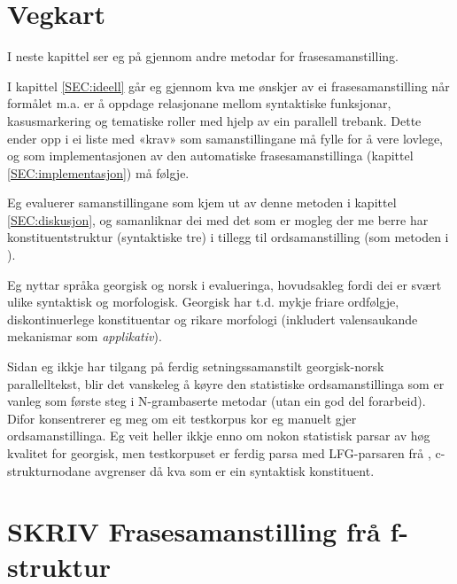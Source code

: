 \documentclass[11pt,a4paper,oneside,draft]{book}
\begin{document}
\section{Vegkart}
\label{sec-1.1}

I neste kapittel ser eg på gjennom andre metodar for frasesamanstilling.

I kapittel \ref{SEC:ideell} går eg gjennom kva me ønskjer av ei
frasesamanstilling når formålet m.a. er å oppdage relasjonane mellom
syntaktiske funksjonar, kasusmarkering og tematiske roller med hjelp
av ein parallell trebank. Dette ender opp i ei liste med «krav» som
samanstillingane må fylle for å vere lovlege, og som implementasjonen
av den automatiske frasesamanstillinga (kapittel
\ref{SEC:implementasjon}) må følgje.

Eg evaluerer samanstillingane som kjem ut av denne metoden i kapittel
\ref{SEC:diskusjon}, og samanliknar dei med det som er mogleg der me
berre har konstituentstruktur (syntaktiske tre) i tillegg til
ordsamanstilling (som metoden i \citet{samuelsson2007apa}).

Eg nyttar språka georgisk og norsk i evalueringa, hovudsakleg fordi
dei er svært ulike syntaktisk og morfologisk.  Georgisk har t.d. mykje
friare ordfølgje, diskontinuerlege konstituentar og rikare morfologi
(inkludert valensaukande mekanismar som \emph{applikativ}).

Sidan eg ikkje har tilgang på ferdig setningssamanstilt georgisk-norsk
parallelltekst, blir det vanskeleg å køyre den statistiske
ordsamanstillinga som er vanleg som første steg i N-grambaserte
metodar (utan ein god del forarbeid). Difor konsentrerer eg meg om eit
testkorpus kor eg manuelt gjer ordsamanstillinga. Eg veit heller ikkje
enno om nokon statistisk parsar av høg kvalitet for georgisk, men
testkorpuset er ferdig parsa med LFG-parsaren frå
\citet{meurer2008cgg}, c-strukturnodane avgrenser då kva som er ein
syntaktisk konstituent.


\section{\textbf{SKRIV} Frasesamanstilling frå f-struktur}
\label{sec-1.2}

\end{document}
